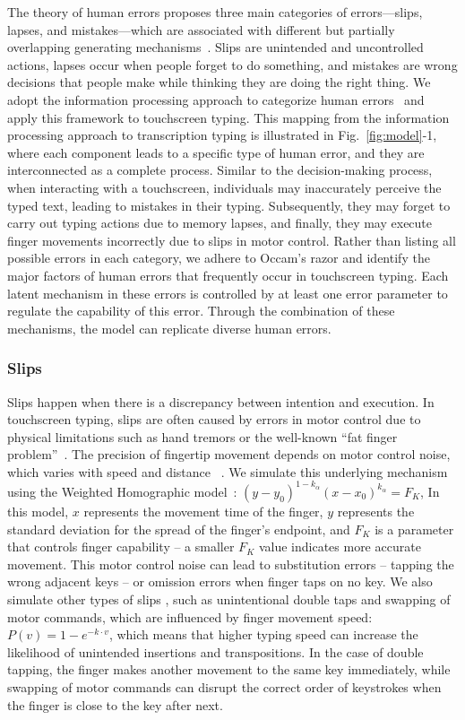The theory of human errors proposes three main categories of errors—slips, lapses, and mistakes—which are associated with different but partially overlapping generating mechanisms~\cite{reason1990human}. 
Slips are unintended and uncontrolled actions, lapses occur when people forget to do something, and mistakes are wrong decisions that people make while thinking they are doing the right thing. 
We adopt the information processing approach to categorize human errors~\cite{wickens2021engineering} and apply this framework to touchscreen typing. 
This mapping from the information processing approach to transcription typing is illustrated in Fig.~\ref{fig:model}-1, where each component leads to a specific type of human error, and they are interconnected as a complete process. 
Similar to the decision-making process, when interacting with a touchscreen, individuals may inaccurately perceive the typed text, leading to mistakes in their typing. Subsequently, they may forget to carry out typing actions due to memory lapses, and finally, they may execute finger movements incorrectly due to slips in motor control. Rather than listing all possible errors in each category, we adhere to Occam's razor and identify the major factors of human errors that frequently occur in touchscreen typing. Each latent mechanism in these errors is controlled by at least one error parameter to regulate the capability of this error. Through the combination of these mechanisms, the model can replicate diverse human errors.

\subsubsection{Slips}

Slips happen when there is a discrepancy between intention and execution. In touchscreen typing, slips are often caused by errors in motor control due to physical limitations such as hand tremors or the well-known ``fat finger problem''~\cite{siek2005fat}.
The precision of fingertip movement depends on motor control noise, which varies with speed and distance ~\cite{fitts1954information}.
We simulate this underlying mechanism using the Weighted Homographic model~\cite{guiard2015mathematical}: $(y-y_0)^{1-k_\alpha}(x-x_0)^{k_\alpha} = F_K$,
In this model, $x$ represents the movement time of the finger, $y$ represents the standard deviation for the spread of the finger's endpoint, and $F_K$ is a parameter that controls finger capability – a smaller $F_K$ value indicates more accurate movement. This motor control noise can lead to substitution errors – tapping the wrong adjacent keys – or omission errors when finger taps on no key. 
We also simulate other types of slips , such as unintentional double taps and swapping of motor commands, which are influenced by finger movement speed: $P(v)=1 - e^{-k \cdot v}$, which means that higher typing speed can increase the likelihood of unintended insertions and transpositions.
In the case of double tapping, the finger makes another movement to the same key immediately, while swapping of motor commands can disrupt the correct order of keystrokes when the finger is close to the key after next.


